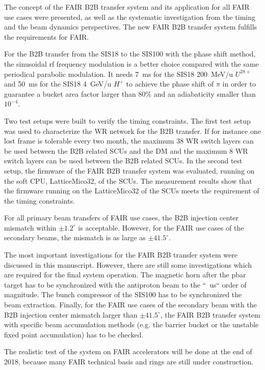 The concept of the FAIR B2B transfer system and its application for all FAIR use cases were presented, as well as the systematic investigation from the timing and the beam dynamics perspectives. The new FAIR B2B transfer system fulfills the requirements for FAIR. 

For the B2B transfer from the SIS18 to the SIS100 with the phase shift method, the sinusoidal rf frequency modulation is a better choice compared with the same periodical parabolic modulation. It needs \SI{7}{ms} for the SIS18 \SI{200}{MeV/u} $U^\mathit{28+}$ and \SI{50}{ms} for the SIS18 \SI{4}{GeV/u} $H^+$ to achieve the phase shift of $\pi$ in order to guarantee a bucket area factor larger than $80\%$ and an adiabaticity smaller than $10^{-4}$.

Two test setups were built to verify the timing constraints. The first test setup was used to characterize the WR network for the B2B transfer. If for instance one lost frame is tolerable every two month, the maximum 38 WR switch layers can be used between the B2B related SCUs and the DM and the maximum 8 WR switch layers can be used between the B2B related SCUs. In the second test setup, the firmware of the FAIR B2B transfer system was evaluated, running on the soft CPU, LatticeMico32, of the SCUs. The measurement results show that the firmware running on the LatticeMico32 of the SCUs meets the requirement of the timing constraints.

For all primary beam transfers of FAIR use cases, the B2B injection center mismatch within $\pm1.2^\circ$ is acceptable. However, for the FAIR use cases of the secondary beams, the mismatch is as large as $\pm41.5^\circ$. 

The most important investigations for the FAIR B2B transfer system were discussed in this manuscript. However, there are still some investigations which are required for the final system operation. The magnetic horn after the pbar target has to be synchronized with the antiproton beam to the ``\SI{}{us}`` order of magnitude. The bunch compressor of the SIS100 has to be synchronized the beam extraction. Finally, for the FAIR use cases of the secondary beam with the B2B injection center mismatch larger than $\pm41.5^\circ$, the FAIR B2B transfer system with specific beam accumulation methods (e.g. the barrier bucket or the unstable fixed point accumulation) has to be checked. 

The realistic test of the system on FAIR accelerators will be done at the end of 2018, because many FAIR technical basis and rings are still under construction.

